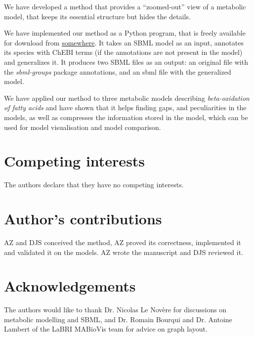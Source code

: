 \documentclass[10pt]{bmc_article}
\newenvironment{bmcformat}{\baselineskip20pt\sloppy\setboolean{publ}{false}}{\baselineskip20pt\sloppy}
\begin{document}
\begin{bmcformat}
We have developed a method that provides a ``zoomed-out'' view of a metabolic model, that keeps its essential structure but hides the details. 

We have implemented our method as a Python program, that is freely available for download from \url{somewhere}. It takes an SBML model as an input, annotates its species with ChEBI terms (if the annotations are not present in the model) and generalizes it. It produces two SBML files as an output: an original file with the \emph{sbml-groups} package annotations, and an sbml file with the generalized model.

We have applied our method to three metabolic models describing \emph{beta-oxidation of fatty acids} and have shown that it helps finding gaps, and peculiarities in the models, as well as compresses the information stored in the model, which can be used for model visualisation and model comparison.

%
%
%		
%			
%

\bigskip

\section*{Competing interests}
The authors declare that they have no competing interests.

\section*{Author's contributions}
    AZ and DJS conceived  the method, AZ proved its correctness, implemented it and validated it on the models. AZ wrote the manuscript and DJS reviewed it.

\section*{Acknowledgements}
  The authors would like to thank Dr. Nicolas Le Nov\`{e}re for discussions on metabolic modelling and SBML, and Dr. Romain Bourqui and Dr. Antoine Lambert of the LaBRI MABioVis team for advice on graph layout.
 

\end{bmcformat}
\end{document}
